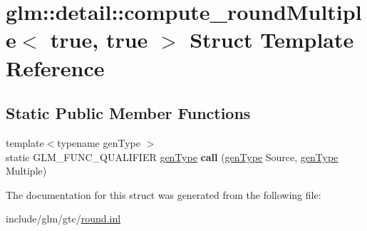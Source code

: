 \hypertarget{structglm_1_1detail_1_1compute__roundMultiple_3_01true_00_01true_01_4}{}\section{glm\+:\+:detail\+:\+:compute\+\_\+round\+Multiple$<$ true, true $>$ Struct Template Reference}
\label{structglm_1_1detail_1_1compute__roundMultiple_3_01true_00_01true_01_4}
\subsection*{Static Public Member Functions}
\begin{DoxyCompactItemize}
\item 
\mbox{\label{structglm_1_1detail_1_1compute__roundMultiple_3_01true_00_01true_01_4_ad2ba30e3338e768e6119c957f44b2216}} 
{\footnotesize template$<$typename gen\+Type $>$ }\\static G\+L\+M\+\_\+\+F\+U\+N\+C\+\_\+\+Q\+U\+A\+L\+I\+F\+I\+ER \hyperlink{structglm_1_1detail_1_1genType}{gen\+Type} {\bfseries call} (\hyperlink{structglm_1_1detail_1_1genType}{gen\+Type} Source, \hyperlink{structglm_1_1detail_1_1genType}{gen\+Type} Multiple)
\end{DoxyCompactItemize}


The documentation for this struct was generated from the following file\+:\begin{DoxyCompactItemize}
\item 
include/glm/gtc/\hyperlink{round_8inl}{round.\+inl}\end{DoxyCompactItemize}
